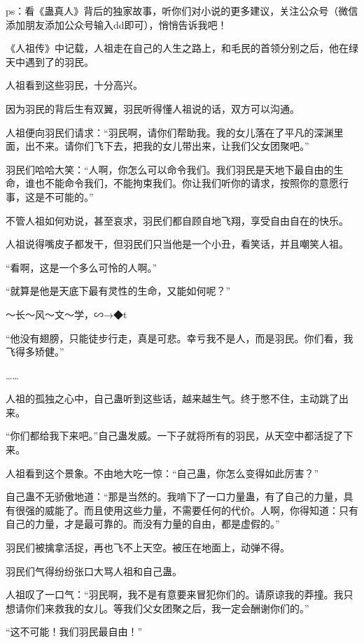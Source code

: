 
\begin{this_body}

ps：看《蛊真人》背后的独家故事，听你们对小说的更多建议，关注公众号（微信添加朋友添加公众号输入dd即可），悄悄告诉我吧！

《人祖传》中记载，人祖走在自己的人生之路上，和毛民的首领分别之后，他在绿天中遇到了的羽民。

人祖看到这些羽民，十分高兴。

因为羽民的背后生有双翼，羽民听得懂人祖说的话，双方可以沟通。

人祖便向羽民们请求：“羽民啊，请你们帮助我。我的女儿落在了平凡的深渊里面，出不来。请你们飞下去，把我的女儿带出来，让我们父女团聚吧。”

羽民们哈哈大笑：“人啊，你怎么可以命令我们。我们羽民是天地下最自由的生命，谁也不能命令我们，不能拘束我们。你让我们听你的请求，按照你的意愿行事，这是不可能的。”

不管人祖如何劝说，甚至哀求，羽民们都自顾自地飞翔，享受自由自在的快乐。

人祖说得嘴皮子都发干，但羽民们只当他是一个小丑，看笑话，并且嘲笑人祖。

“看啊，这是一个多么可怜的人啊。”

“就算是他是天底下最有灵性的生命，又能如何呢？”

～长～风～文～学，∽→◆t

“他没有翅膀，只能徒步行走，真是可悲。幸亏我不是人，而是羽民。你们看，我飞得多矫健。”

……

人祖的孤独之心中，自己蛊听到这些话，越来越生气。终于憋不住，主动跳了出来。

“你们都给我下来吧。”自己蛊发威。一下子就将所有的羽民，从天空中都活捉了下来。

人祖看到这个景象。不由地大吃一惊：“自己蛊，你怎么变得如此厉害？”

自己蛊不无骄傲地道：“那是当然的。我啃下了一口力量蛊，有了自己的力量，具有很强的威能了。而且使用这些力量，不需要任何的代价。人啊，你得知道：只有自己的力量，才是最可靠的。而没有力量的自由，都是虚假的。”

羽民们被擒拿活捉，再也飞不上天空。被压在地面上，动弹不得。

羽民们气得纷纷张口大骂人祖和自己蛊。

人祖叹了一口气：“羽民啊，我不是有意要来冒犯你们的。请原谅我的莽撞。我只想请你们来救我的女儿。等我们父女团聚之后，我一定会酬谢你们的。”

“这不可能！我们羽民最自由！”


\end{this_body}
